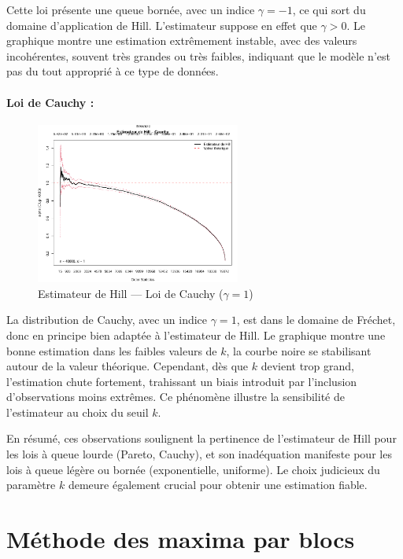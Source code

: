 \documentclass{article}
\theoremstyle{plain}
\theoremstyle{definition}
\theoremstyle{plain}
\begin{document}
Cette loi présente une queue bornée, avec un indice $\gamma = -1$, ce qui sort du domaine d’application de Hill. L’estimateur suppose en effet que $\gamma > 0$. Le graphique montre une estimation extrêmement instable, avec des valeurs incohérentes, souvent très grandes ou très faibles, indiquant que le modèle n’est pas du tout approprié à ce type de données. 
\paragraph{Loi de Cauchy :}
\begin{figure}[H]
    \centering
    \includegraphics[width=0.6\textwidth]{./images/hill_cauchy.png}
    \caption{Estimateur de Hill — Loi de Cauchy ($\gamma = 1$)}
\end{figure}

La distribution de Cauchy, avec un indice $\gamma = 1$, est dans le domaine de Fréchet, donc en principe bien adaptée à l’estimateur de Hill. Le graphique montre une bonne estimation dans les faibles valeurs de $k$, la courbe noire se stabilisant autour de la valeur théorique. Cependant, dès que $k$ devient trop grand, l’estimation chute fortement, trahissant un biais introduit par l'inclusion d’observations moins extrêmes. Ce phénomène illustre la sensibilité de l’estimateur au choix du seuil $k$.
\medskip

En résumé, ces observations soulignent la pertinence de l’estimateur de Hill pour les lois à queue lourde (Pareto, Cauchy), et son inadéquation manifeste pour les lois à queue légère ou bornée (exponentielle, uniforme). Le choix judicieux du paramètre $k$ demeure également crucial pour obtenir une estimation fiable.

\section{Méthode des maxima par blocs}
\end{document}
